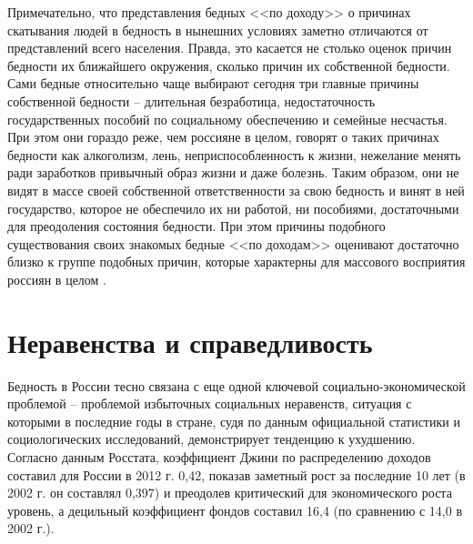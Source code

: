 Примечательно, что представления бедных <<по доходу>> о причинах скатывания 
людей в бедность в нынешних условиях заметно отличаются от представлений всего 
населения. Правда, это касается не столько оценок причин бедности их 
ближайшего окружения, сколько причин их собственной бедности. Сами бедные 
относительно чаще выбирают сегодня три главные причины собственной бедности -- 
длительная безработица, недостаточность государственных пособий по социальному 
обеспечению и семейные несчастья. При этом они гораздо реже, чем россияне в 
целом, говорят о таких причинах бедности как алкоголизм, лень, 
неприспособленность к жизни, нежелание менять ради заработков привычный образ 
жизни и даже болезнь. Таким образом, они не видят в массе своей собственной 
ответственности за свою бедность и винят в ней государство, которое не 
обеспечило их ни работой, ни пособиями, достаточными для преодоления состояния 
бедности. При этом причины подобного существования своих знакомых бедные 
<<по доходам>> оценивают достаточно близко к группе подобных причин, которые 
характерны для массового восприятия россиян в целом \cite{vestnik}.

\section{Неравенства и справедливость}
Бедность в России тесно связана с еще одной ключевой социально-экономической 
проблемой -- проблемой избыточных социальных неравенств, ситуация с которыми в 
последние годы в стране, судя по данным официальной статистики и 
социологических исследований, демонстрирует тенденцию к ухудшению. Согласно 
данным Росстата, коэффициент Джини по распределению доходов составил для 
России в 2012 г. 0,42, показав заметный рост за последние 10 лет (в 2002 г. 
он составлял 0,397) и преодолев критический для экономического роста 
уровень\footnotemark[1], а децильный коэффициент фондов составил 16,4 (по 
сравнению с 14,0 в 2002 г.)\footnotemark[2].


